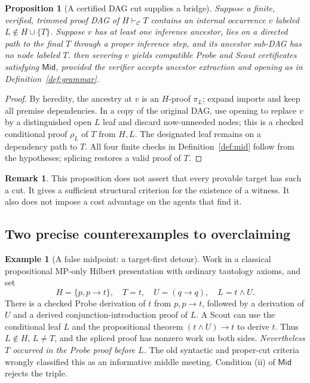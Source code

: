 \documentclass[11pt,letterpaper]{article}
\newtheorem{proposition}[theorem]{Proposition}
\theoremstyle{definition}
\newtheorem{example}[theorem]{Example}
\newtheorem{remark}[theorem]{Remark}
\newcommand{\vdC}{\vdash_{\mathcal C}}
\newcommand{\Mid}{\mathsf{Mid}}
\begin{document}
\begin{proposition}[A certified DAG cut supplies a bridge]\label{prop:cut}
Suppose a finite, verified, trimmed proof DAG of $H\vdC T$ contains an
internal occurrence $v$ labeled $L\notin H\cup\{T\}$. Suppose $v$ has
at least one inference ancestor, lies on a directed path to the final
$T$ through a proper inference step, and its ancestor sub-DAG has no
node labeled $T$. then severing $v$ yields compatible Probe and Scout
certificates satisfying $\Mid$, provided the verifier accepts ancestor
extraction and opening as in Definition~\ref{def:grammar}.
\end{proposition}
\begin{proof}
By heredity, the ancestry at $v$ is an $H$-proof $\pi_L$; expand imports
and keep all premise dependencies. In a copy of the original DAG,
use opening to replace $v$ by a distinguished open $L$ leaf and discard now-unneeded
nodes; this is a checked conditional proof $\rho_L$ of $T$ from $H,L$.
The designated leaf remains on a dependency path to $T$. All four
finite checks in Definition~\ref{def:mid} follow from the hypotheses;
splicing restores a valid proof of $T$.
\end{proof}

\begin{remark}
This proposition does not assert that every provable target has such a
cut. It gives a sufficient structural criterion for the existence of a
witness. It also does not impose a cost advantage on the agents that find it.
\end{remark}

\subsection{Two precise counterexamples to overclaiming}
\begin{example}[A false midpoint: a target-first detour]\label{ex:detour}
Work in a classical propositional MP-only Hilbert presentation with
ordinary tautology axioms, and set
\[
 H=\{p,p\to t\},\quad T=t,\quad U=(q\to q),\quad L=t\land U.
\]
There is a checked Probe derivation of $t$ from $p,p\to t$, followed by
a derivation of $U$ and a derived conjunction-introduction proof of
$L$. A Scout can use the conditional leaf $L$ and the propositional
theorem $(t\land U)\to t$ to derive $t$. Thus $L\notin H$, $L\neq T$,
and the spliced proof has nonzero work on both sides. \emph{Nevertheless
$T$ occurred in the Probe proof before $L$.} The old syntactic and
proper-cut criteria wrongly classified this as an informative middle
meeting. Condition (ii) of $\Mid$ rejects the triple.
\end{example}
\end{document}
